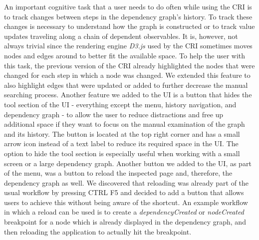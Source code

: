 An important cognitive task that a user needs to do often while using the CRI is to track changes between steps in the dependency graph's history. To track these changes is necessary to understand how the graph is constructed or to track value updates traveling along a chain of dependent observables. It is, however, not always trivial since the rendering engine \emph{D3.js} \cite{D3JS} used by the CRI sometimes moves nodes and edges around to better fit the available space. To help the user with this task, the previous version of the CRI already highlighted the nodes that were changed for each step in which a node was changed. We extended this feature to also highlight edges that were updated or added to further decrease the manual searching process. Another feature we added to the UI is a button that hides the tool section of the UI - everything except the menu, history navigation, and dependency graph - to allow the user to reduce distractions and free up additional space if they want to focus on the manual examination of the graph and its history. The button is located at the top right corner and has a small arrow icon instead of a text label to reduce its required space in the UI. The option to hide the tool section is especially useful when working with a small screen or a large dependency graph. Another button we added to the UI, as part of the menu, was a button to reload the inspected page and, therefore, the dependency graph as well. We discovered that reloading was already part of the usual workflow by pressing CTRL F5 and decided to add a button that allows users to achieve this without being aware of the shortcut. An example workflow in which a reload can be used is to create a \emph{dependencyCreated} or \emph{nodeCreated} breakpoint for a node which is already displayed in the dependency graph, and then reloading the application to actually hit the breakpoint.
